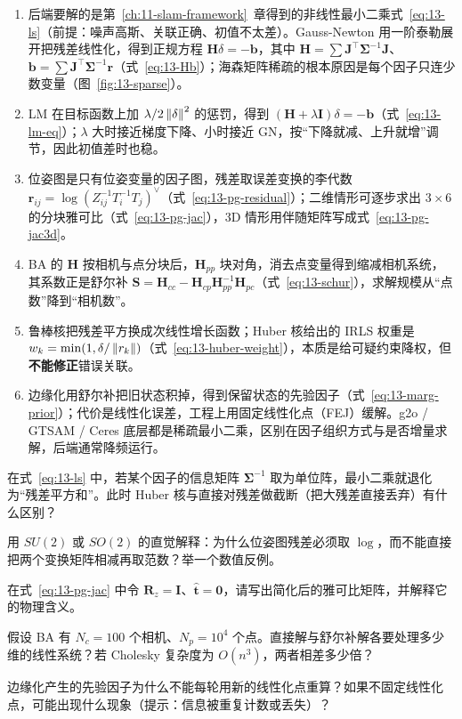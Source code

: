 \begin{summary}
\begin{enumerate}
  \item 后端要解的是第~\ref{ch:11-slam-framework}~章得到的非线性最小二乘式~\eqref{eq:13-ls}（前提：噪声高斯、关联正确、初值不太差）。Gauss-Newton 用一阶泰勒展开把残差线性化，得到正规方程 $\bm{H}\delta=-\bm{b}$，其中 $\bm{H}=\sum\bm{J}^{\top}\bm{\Sigma}^{-1}\bm{J}$、$\bm{b}=\sum\bm{J}^{\top}\bm{\Sigma}^{-1}\bm{r}$（式~\eqref{eq:13-Hb}）；海森矩阵稀疏的根本原因是每个因子只连少数变量（图~\ref{fig:13-sparse}）。
  \item LM 在目标函数上加 $\lambda/2\left\lVert \delta \right\rVert^2$ 的惩罚，得到 $(\bm{H}+\lambda\bm{I})\delta=-\bm{b}$（式~\eqref{eq:13-lm-eq}）；$\lambda$ 大时接近梯度下降、小时接近 GN，按``下降就减、上升就增''调节，因此初值差时也稳。
  \item 位姿图是只有位姿变量的因子图，残差取误差变换的李代数 $\bm{r}_{ij}=\log(Z_{ij}^{-1}T_i^{-1}T_j)^{\vee}$（式~\eqref{eq:13-pg-residual}）；二维情形可逐步求出 $3\times6$ 的分块雅可比（式~\eqref{eq:13-pg-jac}），3D 情形用伴随矩阵写成式~\eqref{eq:13-pg-jac3d}。
  \item BA 的 $\bm{H}$ 按相机与点分块后，$\bm{H}_{pp}$ 块对角，消去点变量得到缩减相机系统，其系数正是舒尔补 $\bm{S}=\bm{H}_{cc}-\bm{H}_{cp}\bm{H}_{pp}^{-1}\bm{H}_{pc}$（式~\eqref{eq:13-schur}），求解规模从``点数''降到``相机数''。
  \item 鲁棒核把残差平方换成次线性增长函数；Huber 核给出的 IRLS 权重是 $w_k=\min(1,\delta/\left\lVert r_k \right\rVert)$（式~\eqref{eq:13-huber-weight}），本质是给可疑约束降权，但\textbf{不能修正}错误关联。
  \item 边缘化用舒尔补把旧状态积掉，得到保留状态的先验因子（式~\eqref{eq:13-marg-prior}）；代价是线性化误差，工程上用固定线性化点（FEJ）缓解。g2o / GTSAM / Ceres 底层都是稀疏最小二乘，区别在因子组织方式与是否增量求解，后端通常降频运行。
\end{enumerate}


\end{summary}

\begin{problemset}
  \item 在式~\eqref{eq:13-ls} 中，若某个因子的信息矩阵 $\bm{\Sigma}^{-1}$ 取为单位阵，最小二乘就退化为``残差平方和''。此时 Huber 核与直接对残差做截断（把大残差直接丢弃）有什么区别？
  \item 用 $SU(2)$ 或 $SO(2)$ 的直觉解释：为什么位姿图残差必须取 $\log$，而不能直接把两个变换矩阵相减再取范数？举一个数值反例。
  \item 在式~\eqref{eq:13-pg-jac} 中令 $\bm{R}_z=\bm{I}$、$\hat{\bm{t}}=\bm{0}$，请写出简化后的雅可比矩阵，并解释它的物理含义。
  \item 假设 BA 有 $N_c=100$ 个相机、$N_p=10^4$ 个点。直接解与舒尔补解各要处理多少维的线性系统？若 Cholesky 复杂度为 $O(n^3)$，两者相差多少倍？
  \item 边缘化产生的先验因子为什么不能每轮用新的线性化点重算？如果不固定线性化点，可能出现什么现象（提示：信息被重复计数或丢失）？
\end{problemset}

